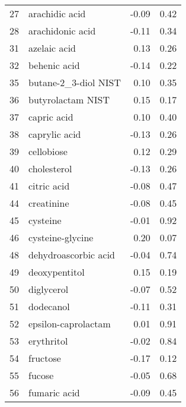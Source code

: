 \begin{tabular}{llrr}
27  &                     arachidic acid &                -0.09 &     0.42 \\
28  &                   arachidonic acid &                -0.11 &     0.34 \\
31  &                       azelaic acid &                 0.13 &     0.26 \\
32  &                       behenic acid &                -0.14 &     0.22 \\
35  &               butane-2\_3-diol NIST &                 0.10 &     0.35 \\
36  &                  butyrolactam NIST &                 0.15 &     0.17 \\
37  &                        capric acid &                 0.10 &     0.40 \\
38  &                      caprylic acid &                -0.13 &     0.26 \\
39  &                         cellobiose &                 0.12 &     0.29 \\
40  &                        cholesterol &                -0.13 &     0.26 \\
41  &                        citric acid &                -0.08 &     0.47 \\
44  &                         creatinine &                -0.08 &     0.45 \\
45  &                           cysteine &                -0.01 &     0.92 \\
46  &                   cysteine-glycine &                 0.20 &     0.07 \\
48  &               dehydroascorbic acid &                -0.04 &     0.74 \\
49  &                      deoxypentitol &                 0.15 &     0.19 \\
50  &                         diglycerol &                -0.07 &     0.52 \\
51  &                          dodecanol &                -0.11 &     0.31 \\
52  &                epsilon-caprolactam &                 0.01 &     0.91 \\
53  &                         erythritol &                -0.02 &     0.84 \\
54  &                           fructose &                -0.17 &     0.12 \\
55  &                             fucose &                -0.05 &     0.68 \\
56  &                       fumaric acid &                -0.09 &     0.45 \\

\end{tabular}
